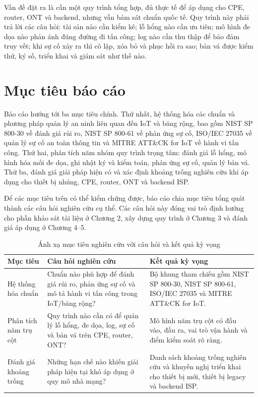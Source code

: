 \documentclass[../DoAn.tex]{subfiles}
\begin{document}
Vấn đề đặt ra là cần một quy trình tổng hợp, đủ thực tế để áp dụng cho CPE, router, ONT và backend, nhưng vẫn bám sát chuẩn quốc tế. Quy trình này phải trả lời các câu hỏi: tài sản nào cần kiểm kê; lỗ hổng nào cần ưu tiên; mô hình đe dọa nào phản ánh đúng đường đi tấn công; log nào cần thu thập để bảo đảm truy vết; khi sự cố xảy ra thì cô lập, xóa bỏ và phục hồi ra sao; bản vá được kiểm thử, ký số, triển khai và giám sát như thế nào.

\section{Mục tiêu báo cáo}
Báo cáo hướng tới ba mục tiêu chính. Thứ nhất, hệ thống hóa các chuẩn và phương pháp quản lý an ninh liên quan đến IoT và băng rộng, bao gồm NIST SP 800-30 về đánh giá rủi ro, NIST SP 800-61 về phản ứng sự cố, ISO/IEC 27035 về quản lý sự cố an toàn thông tin và MITRE ATT\&CK for IoT về hành vi tấn công. Thứ hai, phân tích năm nhóm quy trình trọng tâm: đánh giá lỗ hổng, mô hình hóa mối đe dọa, ghi nhật ký và kiểm toán, phản ứng sự cố, quản lý bản vá. Thứ ba, đánh giá giải pháp hiện có và xác định khoảng trống nghiên cứu khi áp dụng cho thiết bị nhúng, CPE, router, ONT và backend ISP.

Để các mục tiêu trên có thể kiểm chứng được, báo cáo chia mục tiêu tổng quát thành các câu hỏi nghiên cứu cụ thể. Các câu hỏi này đóng vai trò định hướng cho phần khảo sát tài liệu ở Chương 2, xây dựng quy trình ở Chương 3 và đánh giá áp dụng ở Chương 4--5.

\begin{table}[H]
\centering
\begin{tabular}{|l|p{5.2cm}|p{5.4cm}|}
\hline
\textbf{Mục tiêu} & \textbf{Câu hỏi nghiên cứu} & \textbf{Kết quả kỳ vọng} \\ \hline
Hệ thống hóa chuẩn & Chuẩn nào phù hợp để đánh giá rủi ro, phản ứng sự cố và mô tả hành vi tấn công trong IoT/băng rộng? & Bộ khung tham chiếu gồm NIST SP 800-30, NIST SP 800-61, ISO/IEC 27035 và MITRE ATT\&CK for IoT. \\ \hline
Phân tích năm trụ cột & Quy trình nào cần có để quản lý lỗ hổng, đe dọa, log, sự cố và bản vá trên CPE, router, ONT? & Mô hình năm trụ cột có đầu vào, đầu ra, vai trò vận hành và điểm kiểm soát rõ ràng. \\ \hline
Đánh giá khoảng trống & Những hạn chế nào khiến giải pháp hiện tại khó áp dụng ở quy mô nhà mạng? & Danh sách khoảng trống nghiên cứu và khuyến nghị triển khai cho thiết bị mới, thiết bị legacy và backend ISP. \\ \hline
\end{tabular}
\caption{Ánh xạ mục tiêu nghiên cứu với câu hỏi và kết quả kỳ vọng}
\label{tab:research-objectives}
\end{table}
\end{document}
